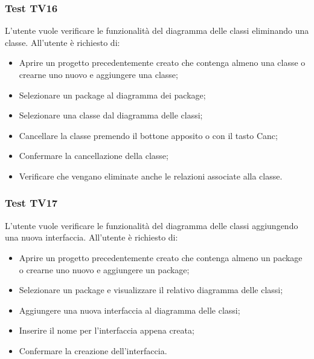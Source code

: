 \documentclass[../PianoDiQualifica.tex]{subfiles}
\begin{document}
	
	\subsubsection{Test TV16} 
	L'utente vuole verificare le funzionalità del diagramma delle classi eliminando una classe. 
	All'utente è richiesto di: 
	\begin{itemize} 
		\item Aprire un progetto precedentemente creato che contenga almeno una classe o crearne uno nuovo e aggiungere una classe;
		\item Selezionare un package al diagramma dei package; 
		\item Selezionare una classe dal diagramma delle classi; 
		\item Cancellare la classe premendo il bottone apposito o con il tasto Canc; 
		\item Confermare la cancellazione della classe; 
		\item Verificare che vengano eliminate anche le relazioni associate alla classe. %
	\end{itemize} 
	
	
	
	\subsubsection{Test TV17} 
	L'utente vuole verificare le funzionalità del diagramma delle classi aggiungendo una nuova interfaccia. 
	All'utente è richiesto di: 
	\begin{itemize} 
		\item Aprire un progetto precedentemente creato che contenga almeno un package o crearne uno nuovo e aggiungere un package;
		\item Selezionare un package e visualizzare il relativo diagramma delle classi; 
		\item Aggiungere una nuova interfaccia al diagramma delle classi; 
		\item Inserire il nome per l'interfaccia appena creata; 
		\item Confermare la creazione dell'interfaccia. 
	\end{itemize} 
	
	
\end{document}

